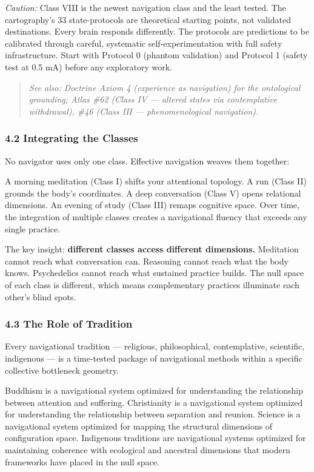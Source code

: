 \textit{Caution:} Class VIII is the newest navigation class and the least tested. The cartography's 33 state-protocols are theoretical starting points, not validated destinations. Every brain responds differently. The protocols are predictions to be calibrated through careful, systematic self-experimentation with full safety infrastructure. Start with Protocol 0 (phantom validation) and Protocol 1 (safety test at 0.5 mA) before any exploratory work.


\begin{quote}
\itshape
\textit{See also: Doctrine Axiom 4 (experience as navigation) for the ontological grounding; Atlas \#62 (Class IV — altered states via contemplative withdrawal), \#46 (Class III — phenomenological navigation).}
\end{quote}


\subsubsection*{4.2 Integrating the Classes}


No navigator uses only one class. Effective navigation weaves them together:


A morning meditation (Class I) shifts your attentional topology. A run (Class II) grounds the body's coordinates. A deep conversation (Class V) opens relational dimensions. An evening of study (Class III) remaps cognitive space. Over time, the integration of multiple classes creates a navigational fluency that exceeds any single practice.


The key insight: \textbf{different classes access different dimensions.} Meditation cannot reach what conversation can. Reasoning cannot reach what the body knows. Psychedelics cannot reach what sustained practice builds. The null space of each class is different, which means complementary practices illuminate each other's blind spots.


\subsubsection*{4.3 The Role of Tradition}


Every navigational tradition — religious, philosophical, contemplative, scientific, indigenous — is a time-tested package of navigational methods within a specific collective bottleneck geometry.


Buddhism is a navigational system optimized for understanding the relationship between attention and suffering. Christianity is a navigational system optimized for understanding the relationship between separation and reunion. Science is a navigational system optimized for mapping the structural dimensions of configuration space. Indigenous traditions are navigational systems optimized for maintaining coherence with ecological and ancestral dimensions that modern frameworks have placed in the null space.


